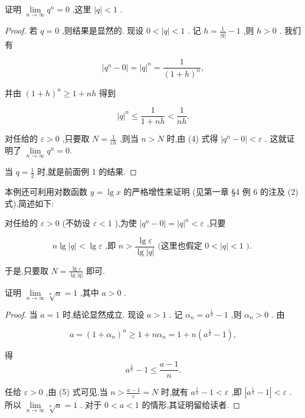 \begin{example}
证明 \(\mathop{\lim }\limits_{{n \rightarrow  \infty }}{q}^{n} = 0\) ,这里 \(\left| q\right|  < 1\) .
\end{example}


\begin{proof}
若 \(q = 0\) ,则结果是显然的. 现设 \(0 < \left| q\right|  < 1\) . 记 \(h = \frac{1}{\left| q\right| } - 1\) ,则 \(h > 0\) . 我们有

\[
\left| {{q}^{n} - 0}\right|  = {\left| q\right| }^{n} = \frac{1}{{\left( 1 + h\right) }^{n}},
\]

并由 \({\left( 1 + h\right) }^{n} \geq  1 + {nh}\) 得到

\[
{\left| q\right| }^{n} \leq  \frac{1}{1 + {nh}} < \frac{1}{nh}. \tag{4}
\]

对任给的 \(\varepsilon  > 0\) ,只要取 \(N = \frac{1}{\varepsilon h}\) ,则当 \(n > N\) 时,由 (4) 式得 \(\left| {{q}^{n} - 0}\right|  < \varepsilon\) . 这就证明了 \(\mathop{\lim }\limits_{{n \rightarrow  \infty }}{q}^{n} = 0.\)

当 \(q = \frac{1}{2}\) 时,就是前面例 1 的结果.

\end{proof}


\begin{remark}
本例还可利用对数函数 \(y = \lg x\) 的严格增性来证明 (见第一章 §4 例 6 的注及 (2)式),简述如下:

对任给的 \(\varepsilon  > 0\) (不妨设 \(\varepsilon  < 1\) ),为使 \(\left| {{q}^{n} - 0}\right|  = {\left| q\right| }^{n} < \varepsilon\) ,只要

\[
n\lg \left| q\right|  < \lg \varepsilon \text{ ,即 }n > \frac{\lg \varepsilon }{\lg \left| q\right| }\text{ (这里也假定 }0 < \left| q\right|  < 1\text{ ). }
\]

于是,只要取 \(N = \frac{\lg \varepsilon }{\lg \left| q\right| }\) 即可.
\end{remark}


\begin{example}
证明 \(\mathop{\lim }\limits_{{n \rightarrow  \infty }}\sqrt[n]{a} = 1\) ,其中 \(a > 0\) .
\end{example}


\begin{proof}
当 \(a = 1\) 时,结论显然成立. 现设 \(a > 1\) . 记 \({\alpha }_{n} = {a}^{\frac{1}{n}} - 1\) ,则 \({\alpha }_{n} > 0\) . 由

\[
a = {\left( 1 + {\alpha }_{n}\right) }^{n} \geq  1 + n{\alpha }_{n} = 1 + n\left( {{a}^{\frac{1}{n}} - 1}\right) ,
\]

得
\[
{a}^{\frac{1}{n}} - 1 \leq  \frac{a - 1}{n}. \tag{5}
\]

任给 \(\varepsilon  > 0\) ,由 (5) 式可见,当 \(n > \frac{a - 1}{\varepsilon } = N\) 时,就有 \({a}^{\frac{1}{n}} - 1 < \varepsilon\) ,即 \(\left| {{a}^{\frac{1}{n}} - 1}\right|  < \varepsilon\) . 所以 \(\mathop{\lim }\limits_{{n \rightarrow  \infty }}\sqrt[n]{a} = 1\) . 对于 \(0 < a < 1\) 的情形,其证明留给读者.

\end{proof}


